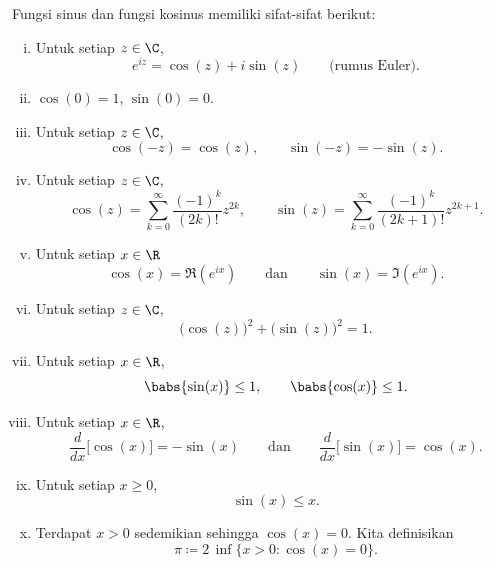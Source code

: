 \begin{prop}
Fungsi sinus dan fungsi kosinus memiliki sifat-sifat berikut:
\begin{enumerate}[(i)]
\item Untuk setiap $z \in \C$,
\begin{equation*}
e^{iz} = \cos(z) + i\sin(z) \qquad
\text{(rumus Euler)}.
\end{equation*}
\item $\cos(0) = 1$, $\sin(0) = 0$.
\item Untuk setiap $z \in \C$,
\begin{equation*}
\cos(-z) = \cos(z), \qquad
\sin(-z) = -\sin(z).
\end{equation*}
\item Untuk setiap $z \in \C$,
\begin{equation*}
\cos(z) = \sum_{k=0}^\infty \frac{{(-1)}^k}{(2k)!} z^{2k} ,
\qquad
\sin(z) = \sum_{k=0}^\infty \frac{{(-1)}^k}{(2k+1)!} z^{2k+1} .
\end{equation*}
\item Untuk setiap $x \in \R$
\begin{equation*}
\cos(x) = \Re (e^{ix})
\qquad\text{dan}\qquad
\sin(x) = \Im (e^{ix}) .
\end{equation*}
\item Untuk setiap $z \in \C$,
\begin{equation*}
{\bigl( \cos(z) \bigr)}^2 + {\bigl( \sin(z) \bigr)}^2 = 1 .
\end{equation*}
\item Untuk setiap $x \in \R$,
\begin{equation*}
\babs{\sin(x)} \leq 1, \qquad \babs{\cos(x)} \leq 1 .
\end{equation*}
\item Untuk setiap $x \in \R$,
\begin{equation*}
\frac{d}{dx} \bigl[ \cos(x) \bigr] = -\sin(x)
\qquad \text{dan} \qquad
\frac{d}{dx} \bigl[ \sin(x) \bigr] = \cos(x) .
\end{equation*}
\item Untuk setiap $x \geq 0$,
\begin{equation*}
\sin(x) \leq x .
\end{equation*}
\item
Terdapat $x > 0$ sedemikian sehingga $\cos(x) = 0$. Kita definisikan
\begin{equation*}
\pi \coloneqq 2 \, \inf \{ x > 0 : \cos(x) = 0 \} .
\end{equation*}

\end{enumerate}
\end{prop}
